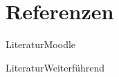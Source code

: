 \section{Referenzen}
\begin{frame}[allowframebreaks]{Literatur}{Moodle}
	\printbibliography[keyword={moodle}]
\end{frame}

\begin{frame}[allowframebreaks]{Literatur}{Weiterführend}
	\printbibliography[notkeyword={moodle}]
\end{frame}